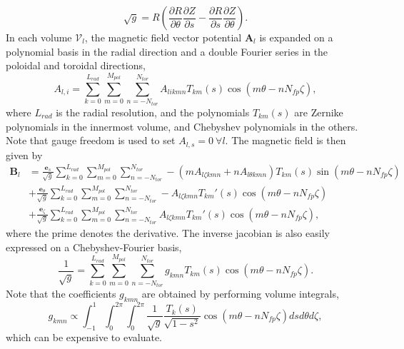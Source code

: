 \documentclass[my_thesis.tex]{subfiles}
\begin{document}
\begin{equation}
	\sqrt{g} = R\left(\frac{\partial R}{\partial \theta}\frac{\partial Z}{\partial s}-\frac{\partial R}{\partial s}\frac{\partial Z}{\partial \theta}\right).
\end{equation}
In each volume $\mathcal{V}_l$, the magnetic field vector potential $\mathbf{A}_l$ is  expanded on a polynomial basis in the radial direction and a double Fourier series in the poloidal and toroidal directions,
\begin{equation}
	A_{l,i} = \sum_{k=0}^{L_{rad}}\sum_{m=0}^{M_{pol}}\sum_{n=-N_{tor}}^{N_{tor}} A_{likmn} T_{km}(s)\cos(m\theta-nN_{fp}\zeta),
\end{equation}
where $L_{rad}$ is the radial resolution, and the polynomials $T_{km}(s)$ are Zernike polynomials in the innermost volume, and Chebyshev polynomials in the others. Note that gauge freedom is used to set $A_{l,s}=0\ \forall l$. The magnetic field is then given by 
\begin{align}
\mathbf{B}_l &=  \frac{\mathbf{e}_s}{\sqrt{g}}\sum_{k=0}^{L_{rad}}\sum_{m=0}^{M_{pol}}\sum_{n=-N_{tor}}^{N_{tor}} -(mA_{l\zeta kmn}+nA_{l\theta kmn})T_{km}(s)\sin(m\theta-nN_{fp}\zeta) \label{eq.bs contravariant}\\
&+ \frac{\mathbf{e}_\theta }{\sqrt{g}}\sum_{k=0}^{L_{rad}}\sum_{m=0}^{M_{pol}}\sum_{n=-N_{tor}}^{N_{tor}} -A_{l\zeta kmn}T_{km}'(s)\cos(m\theta-nN_{fp}\zeta)\label{eq.bt contravariant}\\
&+ \frac{\mathbf{e}_\zeta}{\sqrt{g}}\sum_{k=0}^{L_{rad}}\sum_{m=0}^{M_{pol}}\sum_{n=-N_{tor}}^{N_{tor}} A_{l\zeta kmn}T_{km}'(s)\cos(m\theta-nN_{fp}\zeta),\label{eq.bz contravariant}
\end{align}
where the prime denotes the derivative. The inverse jacobian is also easily expressed on a Chebyshev-Fourier basis,
\begin{equation}
\frac{1}{\sqrt{g}} = \sum_{k=0}^{L_{rad}}\sum_{m=0}^{M_{pol}}\sum_{n=-N_{tor}}^{N_{tor}} g_{kmn}T_{km}(s)\cos(m\theta-nN_{fp}\zeta).
\end{equation}
Note that the coefficients $g_{kmn}$ are obtained by performing volume integrals,
\begin{equation}
   g_{kmn} \propto \int_{-1}^{1} \int_0^{2\pi}\int_0^{2\pi} \frac{1}{\sqrt{g}} \frac{T_k(s)}{\sqrt{1-s^2}}\cos(m\theta-nN_{fp}\zeta)dsd\theta d\zeta, \label{eq. sqrtg volume integral}
\end{equation}
which can be expensive to evaluate.
\end{document}
